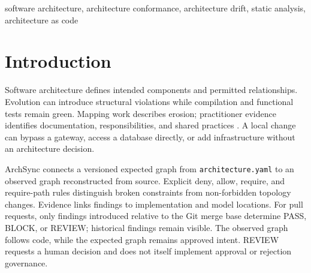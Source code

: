 \documentclass[conference]{IEEEtran}
\begin{document}
\begin{abstract}
Software teams can keep builds green while implementation relationships drift away from an approved architecture, leaving reviewers without a repeatable way to decide whether a change is harmless, forbidden, or a legitimate evolution. This paper presents ArchSync, a deterministic architecture-conformance prototype that treats a machine-readable model as an executable contract and reconstructs an observed service graph from TypeScript source code. Stack-specific analyzers detect selected HTTP, PostgreSQL, Redis, and AMQP interactions, preserve file-level evidence, and feed a Git-diff gate that maps introduced findings to PASS, BLOCK, or REVIEW without rewriting the approved model. We verify the prototype on two co-developed development datasets and replay the same controlled changes through the incremental gate. Within these finite regression sets, the implementation agrees with the declared graph, decision, evidence-location, and full-scan oracles, and provenance tracking removes the targeted detector errors exposed by the earlier analyzer. An external-tool comparison remains proposed and was not executed within the reported evaluation; no accepted comparator result or common label mapping is available, and the study lacks an independently curated real-world holdout. Its results therefore establish executable-contract coherence and reproducible regression behavior only, not comparative advantage or general accuracy on TypeScript systems.
\end{abstract}


\begin{IEEEkeywords}
software architecture, architecture conformance, architecture drift, static analysis, architecture as code
\end{IEEEkeywords}

\section{Introduction}
Software architecture defines intended components and permitted relationships. Evolution can introduce structural violations while compilation and functional tests remain green. Mapping work describes erosion; practitioner evidence identifies documentation, responsibilities, and shared practices \cite{li2022erosion,anthony2024drifting}. A local change can bypass a gateway, access a database directly, or add infrastructure without an architecture decision.

ArchSync connects a versioned expected graph from \texttt{architecture.yaml} to an observed graph reconstructed from source. Explicit deny, allow, require, and require-path rules distinguish broken constraints from non-forbidden topology changes. Evidence links findings to implementation and model locations. For pull requests, only findings introduced relative to the Git merge base determine PASS, BLOCK, or REVIEW; historical findings remain visible. The observed graph follows code, while the expected graph remains approved intent. REVIEW requests a human decision and does not itself implement approval or rejection governance.
\end{document}
